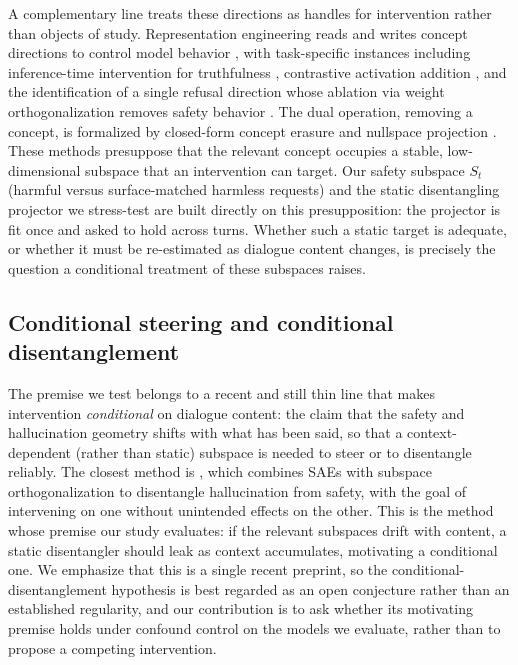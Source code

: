 A complementary line treats these directions as handles for intervention rather than objects of study. Representation engineering reads and writes concept directions to control model behavior \citep{zou2023repe}, with task-specific instances including inference-time intervention for truthfulness \citep{li2023iti}, contrastive activation addition \citep{panickssery2024caa}, and the identification of a single refusal direction whose ablation via weight orthogonalization removes safety behavior \citep{arditi2024refusal}. The dual operation, removing a concept, is formalized by closed-form concept erasure \citep{belrose2023leace} and nullspace projection \citep{ravfogel2020inlp}. These methods presuppose that the relevant concept occupies a stable, low-dimensional subspace that an intervention can target. Our safety subspace $S_t$ (harmful versus surface-matched harmless requests) and the static disentangling projector we stress-test are built directly on this presupposition: the projector is fit once and asked to hold across turns. Whether such a static target is adequate, or whether it must be re-estimated as dialogue content changes, is precisely the question a conditional treatment of these subspaces raises.

\subsection{Conditional steering and conditional disentanglement}

The premise we test belongs to a recent and still thin line that makes intervention \emph{conditional} on dialogue content: the claim that the safety and hallucination geometry shifts with what has been said, so that a context-dependent (rather than static) subspace is needed to steer or to disentangle reliably. The closest method is \citet{mahmoud2025unintended}, which combines SAEs with subspace orthogonalization to disentangle hallucination from safety, with the goal of intervening on one without unintended effects on the other. This is the method whose premise our study evaluates: if the relevant subspaces drift with content, a static disentangler should leak as context accumulates, motivating a conditional one. We emphasize that this is a single recent preprint, so the conditional-disentanglement hypothesis is best regarded as an open conjecture rather than an established regularity, and our contribution is to ask whether its motivating premise holds under confound control on the models we evaluate, rather than to propose a competing intervention.

